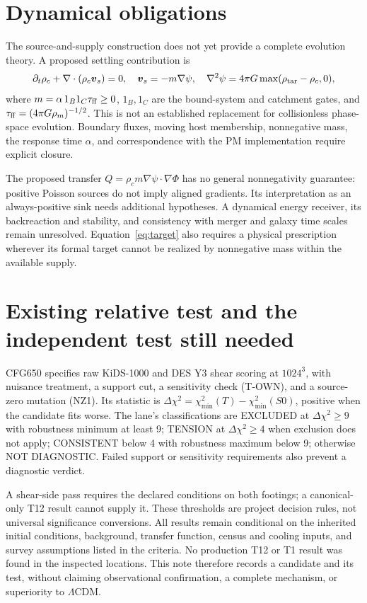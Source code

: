\documentclass[11pt]{article}
\begin{document}
\section{Dynamical obligations}
The source-and-supply construction does not yet provide a complete evolution theory. A proposed settling contribution is
\begin{equation}
 \partial_t\rho_c+\nabla\cdot(\rho_c\boldsymbol v_s)=0,\quad
 \boldsymbol v_s=-m\nabla\psi,\quad
 \nabla^2\psi=4\pi G\max(\rho_{\rm tar}-\rho_c,0),
\end{equation}
where $m=\alpha\,1_B1_C\tau_{\rm ff}\geq0$, $1_B,1_C$ are the bound-system and catchment gates, and $\tau_{\rm ff}=(4\pi G\rho_m)^{-1/2}$. This is not an established replacement for collisionless phase-space evolution. Boundary fluxes, moving host membership, nonnegative mass, the response time $\alpha$, and correspondence with the PM implementation require explicit closure.

The proposed transfer $Q=\rho_c m\nabla\psi\cdot\nabla\Phi$ has no general nonnegativity guarantee: positive Poisson sources do not imply aligned gradients. Its interpretation as an always-positive sink needs additional hypotheses. A dynamical energy receiver, its backreaction and stability, and consistency with merger and galaxy time scales remain unresolved. Equation~\eqref{eq:target} also requires a physical prescription wherever its formal target cannot be realized by nonnegative mass within the available supply.

\section{Existing relative test and the independent test still needed}
CFG650 specifies raw KiDS-1000 and DES Y3 shear scoring at $1024^3$, with nuisance treatment, a support cut, a sensitivity check (T-OWN), and a source-zero mutation (NZ1). Its statistic is $\Delta\chi^2=\chi^2_{\min}(T)-\chi^2_{\min}(S0)$, positive when the candidate fits worse. The lane's classifications are EXCLUDED at $\Delta\chi^2\geq9$ with robustness minimum at least 9; TENSION at $\Delta\chi^2\geq4$ when exclusion does not apply; CONSISTENT below 4 with robustness maximum below 9; otherwise NOT DIAGNOSTIC. Failed support or sensitivity requirements also prevent a diagnostic verdict.

A shear-side pass requires the declared conditions on both footings; a canonical-only T12 result cannot supply it. These thresholds are project decision rules, not universal significance conversions. All results remain conditional on the inherited initial conditions, background, transfer function, census and cooling inputs, and survey assumptions listed in the criteria. No production T12 or T1 result was found in the inspected locations. This note therefore records a candidate and its test, without claiming observational confirmation, a complete mechanism, or superiority to $\Lambda$CDM.
\end{document}
